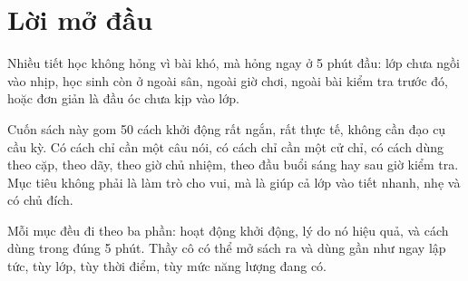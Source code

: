 \chapter*{Lời mở đầu}

Nhiều tiết học không hỏng vì bài khó, mà hỏng ngay ở 5 phút đầu: lớp chưa ngồi vào nhịp, học sinh còn ở ngoài sân, ngoài giờ chơi, ngoài bài kiểm tra trước đó, hoặc đơn giản là đầu óc chưa kịp vào lớp.

Cuốn sách này gom 50 cách khởi động rất ngắn, rất thực tế, không cần đạo cụ cầu kỳ. Có cách chỉ cần một câu nói, có cách chỉ cần một cử chỉ, có cách dùng theo cặp, theo dãy, theo giờ chủ nhiệm, theo đầu buổi sáng hay sau giờ kiểm tra. Mục tiêu không phải là làm trò cho vui, mà là giúp cả lớp vào tiết nhanh, nhẹ và có chủ đích.

Mỗi mục đều đi theo ba phần: hoạt động khởi động, lý do nó hiệu quả, và cách dùng trong đúng 5 phút. Thầy cô có thể mở sách ra và dùng gần như ngay lập tức, tùy lớp, tùy thời điểm, tùy mức năng lượng đang có.